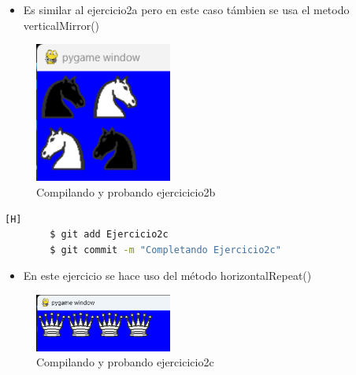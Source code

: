 \documentclass{article}
\begin{document}
	
	\begin{itemize}	
		\item Es similar al ejercicio2a pero en este caso támbien se usa el metodo verticalMirror()
	\end{itemize}
	\begin{figure}[H]
		\centering
		\includegraphics[width=0.4\textwidth,keepaspectratio]{img/2b.png}
		\caption{Compilando y probando ejercicicio2b}
	\end{figure}

        \begin{lstlisting}[language=bash,caption={Completando Ejercicio2c}][H]
		$ git add Ejercicio2c
		$ git commit -m "Completando Ejercicio2c"			
	\end{lstlisting}
	
	\begin{itemize}	
		\item En este ejercicio se hace uso del método horizontalRepeat()
	\end{itemize}
	\begin{figure}[H]
		\centering
		\includegraphics[width=0.4\textwidth,keepaspectratio]{img/2c.png}
		\caption{Compilando y probando ejercicicio2c}
	\end{figure}
\end{document}
